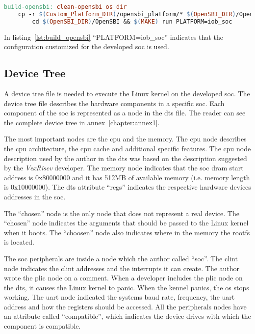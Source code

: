 \begin{lstlisting}[language=make, caption={Makefile target to build OpenSBI.}, label=lst:build_opensbi]
build-opensbi: clean-opensbi os_dir
    cp -r $(Custom_Platform_DIR)/opensbi_platform/* $(OpenSBI_DIR)/OpenSBI/platform/ && \
        cd $(OpenSBI_DIR)/OpenSBI && $(MAKE) run PLATFORM=iob_soc
\end{lstlisting}

In listing~\ref{lst:build_opensbi} \enquote{PLATFORM=iob\_soc} indicates that the configuration customized for the developed \acrshort{soc} is used.

\subsection{Device Tree}
A device tree file is needed to execute the Linux kernel on the developed \acrshort{soc}. The device tree file describes the hardware components in a specific \acrshort{soc}. Each component of the \acrshort{soc} is represented as a node in the \acrfull{dts} file. The reader can see the complete device tree in annex~\ref{chapter:annex1}.

The most important nodes are the \acrshort{cpu} and the memory. The \acrshort{cpu} node describes the \acrshort{cpu} architecture, the \acrshort{cpu} cache and additional specific features. The \acrshort{cpu} node description used by the author in the \acrfull{dts} was based on the description suggested by the \textit{VexRiscv} developer. The memory node indicates that the \acrshort{soc} \acrshort{dram} start address is 0x80000000 and it has 512MB of available memory (i.e. memory length is 0x10000000). The \acrshort{dts} attribute \enquote{regs} indicates the respective hardware devices addresses in the \acrshort{soc}.

The \enquote{chosen} node is the only node that does not represent a real device. The \enquote{chosen} node indicates the arguments that should be passed to the Linux kernel when it boots. The \enquote{choosen} node also indicates where in the memory the \acrlong{rootfs} is located.

The \acrshort{soc} peripherals are inside a node which the author called \enquote{soc}. The \acrshort{clint} node indicates the  \acrshort{clint} addresses and the interrupts it can create. The author wrote the \acrshort{plic} node on a comment. When a developer includes the \acrshort{plic} node on the \acrshort{dts}, it causes the Linux kernel to panic. When the kennel panics, the \acrshort{os} stops working. The \acrshort{uart} node indicated the systems baud rate, frequency, the \acrshort{uart} address and how the registers should be accessed. All the peripherals nodes have an attribute called \enquote{compatible}, which indicates the device drives with which the component is compatible.

